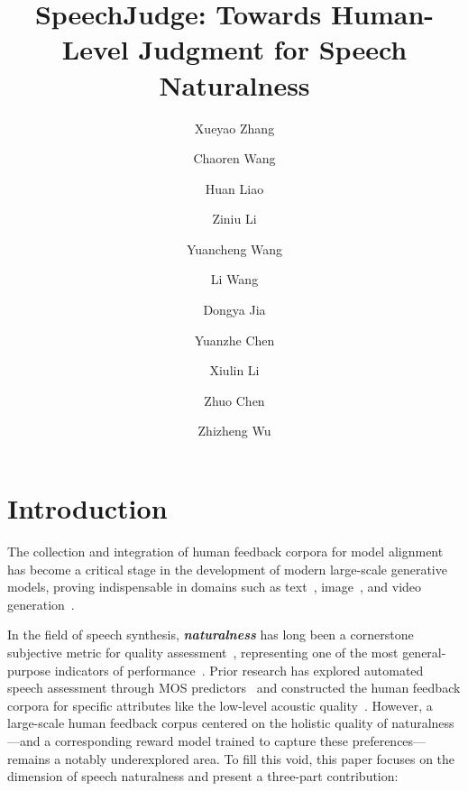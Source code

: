 \documentclass[]{bytedance_seed}
\title{SpeechJudge: Towards Human-Level Judgment for Speech Naturalness}
\author[1,2,*]{Xueyao Zhang}
\author[1,*]{Chaoren Wang}
\author[1]{Huan Liao}
\author[1]{Ziniu Li}
\author[1]{Yuancheng Wang}
\author[1]{Li Wang}
\author[2]{Dongya Jia}
\author[2]{Yuanzhe Chen}
\author[3]{Xiulin Li}
\author[2]{Zhuo Chen}
\author[1]{Zhizheng Wu}
\affiliation[1]{The Chinese University of Hong Kong, Shenzhen}
\affiliation[2]{ByteDance Seed}
\affiliation[3]{DataBaker Technology}
\begin{document}
\maketitle


% 
% 
% 
% 

\section{Introduction}

The collection and integration of human feedback corpora for model alignment has become a critical stage in the development of modern large-scale generative models, proving indispensable in domains such as text~\citep{openai-rm,instructgpt,RLHF-anthoropic}, image~\citep{imagereward,pick-a-pic}, and video generation~\citep{visionreward,videoreward}. 

\renewcommand{\thefootnote}{\fnsymbol{footnote}}
\renewcommand{\thefootnote}{\arabic{footnote}} %


In the field of speech synthesis, \textbf{\textit{naturalness}} has long been a cornerstone subjective metric for quality assessment~\citep{naturalspeech3,seedtts,cosyvoice,qwen2.5-omni,kimi-audio}, representing one of the most general-purpose indicators of performance~\citep{tts-book-paul-taylor,tts-book-tanxu}. Prior research has explored automated speech assessment through MOS predictors~\citep{utmos,voicemos-challenge-2024} and constructed the human feedback corpora for specific attributes like the low-level acoustic quality~\citep{qualispeech}. However, a large-scale human feedback corpus centered on the holistic quality of naturalness—and a corresponding reward model trained to capture these preferences—remains a notably underexplored area. To fill this void, this paper focuses on the dimension of speech naturalness and present a three-part contribution:
\end{document}
